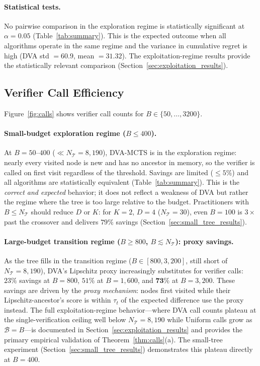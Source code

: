 \paragraph{Statistical tests.}
No pairwise comparison in the exploration regime is statistically significant at
$\alpha{=}0.05$ (Table~\ref{tab:summary}). This is the expected outcome when all
algorithms operate in the same regime and the variance in cumulative regret is high
(DVA std $= 60.9$, mean $= 31.32$). The exploitation-regime results provide the
statistically relevant comparison (Section~\ref{sec:exploitation_results}).

\subsection{Verifier Call Efficiency}
\label{sec:efficiency_results}

Figure~\ref{fig:calls} shows verifier call counts for $B \in \{50,\ldots,3200\}$.

\paragraph{Small-budget exploration regime ($B \leq 400$).}
At $B{=}50$--$400$ ($\ll N_{\mathcal{T}}{=}8{,}190$), DVA-MCTS is in the exploration
regime: nearly every visited node is new and has no ancestor in memory, so the
verifier is called on first visit regardless of the threshold.  Savings are
limited (${\leq}5\%$) and all algorithms are statistically equivalent
(Table~\ref{tab:summary}).  This is the \emph{correct and expected} behavior;
it does not reflect a weakness of DVA but rather the regime where the tree
is too large relative to the budget.  Practitioners with $B \leq N_{\mathcal{T}}$
should reduce $D$ or $K$: for $K{=}2$, $D{=}4$ ($N_{\mathcal{T}}{=}30$), even
$B{=}100$ is $3\times$ past the crossover and delivers $79\%$ savings
(Section~\ref{sec:small_tree_results}).

\paragraph{Large-budget transition regime ($B \geq 800$, $B \lesssim N_{\mathcal{T}}$): proxy savings.}
As the tree fills in the transition regime ($B \in [800, 3{,}200]$, still short of
$N_{\mathcal{T}}{=}8{,}190$), DVA's Lipschitz proxy increasingly substitutes for
verifier calls: $23\%$ savings at $B{=}800$, $51\%$ at $B{=}1{,}600$, and
$\mathbf{73\%}$ at $B{=}3{,}200$.  These savings are driven by the
\emph{proxy mechanism}: nodes first visited while their Lipschitz-ancestor's
score is within $\tau_t$ of the expected difference use the proxy instead.
The full exploitation-regime behavior---where DVA call counts plateau at the
single-verification ceiling well below $N_{\mathcal{T}} = 8{,}190$ while Uniform
calls grow as $\mathcal{B} = B$---is documented in Section~\ref{sec:exploitation_results}
and provides the primary empirical validation of Theorem~\ref{thm:calls}(a).
The small-tree experiment (Section~\ref{sec:small_tree_results}) demonstrates
this plateau directly at $B{=}400$.

